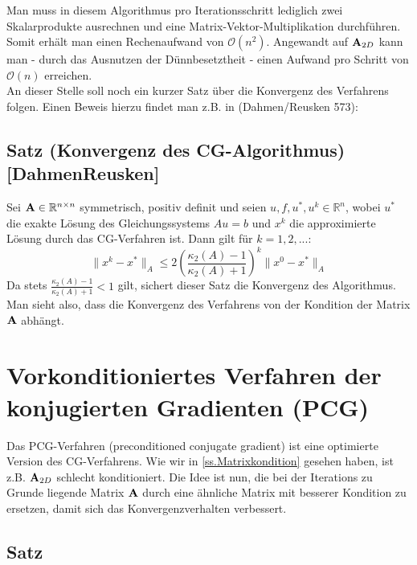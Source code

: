 Man muss in diesem Algorithmus pro Iterationsschritt lediglich zwei Skalarprodukte ausrechnen und eine Matrix-Vektor-Multiplikation durchführen. Somit erhält man einen Rechenaufwand von $\mathcal{O}(n^{2})$. Angewandt auf ${\textbf{A}}_{2D}$ kann man - durch das Ausnutzen der Dünnbesetztheit - einen Aufwand pro Schritt von $\mathcal{O}(n)$ erreichen. \\

An dieser Stelle soll noch ein kurzer Satz über die Konvergenz des Verfahrens folgen. Einen Beweis hierzu findet man z.B. in (Dahmen/Reusken 573):

\subsection{Satz (Konvergenz des CG-Algorithmus) [DahmenReusken]}\label{ss.Konvergenz CG}

Sei ${\textbf{A}} \in \mathbb{R}^{n \times n}$ symmetrisch, positiv definit und seien $u,f,u^{*},u^{k} \in \mathbb{R}^{n}$, wobei $u^{*}$ die exakte Lösung des Gleichungssystems $Au = b$ und $x^{k}$ die approximierte Lösung durch das CG-Verfahren ist. Dann gilt für $k = 1,2,...$:
\begin{equation}
\| x^{k} - x^{*} \|_{A} \le 2 \left( \frac {\kappa_{2} (A) - 1} {\kappa_{2} (A) + 1} \right)^{k} \| x^{0} - x^{*} \|_{A}
\end{equation}
Da stets $\frac {\kappa_{2} (A) - 1} {\kappa_{2} (A) + 1} < 1$ gilt, sichert dieser Satz die Konvergenz des Algorithmus. Man sieht also, dass die Konvergenz des Verfahrens von der Kondition der Matrix ${\textbf{A}}$ abhängt. \\

\section{Vorkonditioniertes Verfahren der konjugierten Gradienten (PCG)}\label{s.PCG}

Das PCG-Verfahren (preconditioned conjugate gradient) ist eine optimierte Version des CG-Verfahrens. Wie wir in \autoref{ss.Matrixkondition} gesehen haben, ist z.B. ${\textbf{A}}_{2D}$ schlecht konditioniert. Die Idee ist nun, die bei der Iterations zu Grunde liegende Matrix ${\textbf{A}}$ durch eine ähnliche Matrix mit besserer Kondition zu ersetzen, damit sich das Konvergenzverhalten verbessert.

\subsection{Satz}

